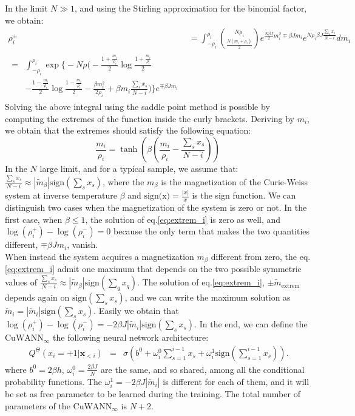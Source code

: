 \documentclass[aps,physrev,10pt,floatfix,longbibliography,nofootinbib,reprint]{revtex4-2}
\begin{document}
In the limit $N \gg 1$, and using the Stirling approximation for the binomial factor, we obtain:
 \begin{align}
 \rho_i^{\pm} & = 
  \int_{-\rho_i}^{\rho_i} \binom{N\rho_i}{\frac{N(m_i+\rho_i)}{2}} e^{\frac{N \beta J}{2}m_i^{2} \mp \beta J m_i } e^{N \rho_i \beta J \frac{\sum_s x_s}{N-i}} dm_i \\
\begin{split} 
  = & \int_{-\rho_i}^{\rho_i} \exp\bigg\{-N\rho\big( -\frac{1+\frac{m_i}{\rho_i}}{2} \log\frac{1+\frac{m_i}{\rho_i}}{2} \\
   & - \frac{1-\frac{m_i}{\rho_i}}{2} \log\frac{1-\frac{m_i}{\rho_i}}{2} 
      - \frac{\beta m_i^2}{2 \rho_i} + \beta m_i \frac{\sum_s x_s}{N-i}\big) \bigg\} e^{\mp \beta J m_i}
\end{split}
\end{align}
Solving the above integral using the saddle point method is possible by computing the extremes of the function inside the curly brackets. Deriving by $m_i$, we obtain that the extremes should satisfy the following equation:
\begin{equation}
\frac{m_i}{\rho_i} = \tanh \left( \beta(\frac{m_i}{\rho_i} - \frac{\sum_s x_s}{N-i}) \right)
\label{eq:extrem_i}
\end{equation}
In the $N$ large limit, and for a typical sample, we assume that: $\frac{\sum_s x_s}{N-i} \approx |\tilde{m}_{\beta}| \text{sign}(\sum_s x_s)$, where the $m_{\beta}$ is the magnetization of the Curie-Weiss system at inverse temperature $\beta$ and $\text{sign(x)} = \frac{|x|}{x}$ is the sign function.
We can distinguish two cases when the magnetization of the system is zero or not. 
In the first case, when $\beta\leq 1$, the solution of eq.\ref{eq:extrem_i} is zero as well, and $\log(\rho_i^{+}) - \log(\rho_i^{-})=0$ because the only term that makes the two quantities different, $\mp \beta J m_i$, vanish.\\ 
When instead the system acquires a magnetization $m_{\beta}$ different from zero, the eq.\ref{eq:extrem_i} admit one maximum that depends on the two possible symmetric values of $\frac{\sum_s x_s}{N-i}\approx |\tilde{m}_{\beta}| \text{sign}(\sum_q x_q)$. 
The solution of eq.\ref{eq:extrem_i}, $\pm \tilde{m}_{\text{extrem}}$ depends again on $\text{sign}(\sum_s x_s)$, and we can write the maximum solution as $\tilde{m}_{i}=|\tilde{m}_i| \text{sign}(\sum_s x_s)$. 
Easily we obtain that $\log(\rho_i^{+}) - \log(\rho_i^{-}) = -2\beta J|\tilde{m}_i| \text{sign}(\sum_s x_s)$. 
In the end, we can define the $\text{CuWANN}_{\infty}$ the following neural network architecture:
\begin{eqnarray}\
\label{eq:curie_weiss_cond2}
Q^{\Theta}\left(x_{i}=+1|\mathbf{x}_{<i}\right) & = & \sigma \left(b^0+\omega_{i}^0\sum_{s=1}^{i-1}x_{s} + \omega_i^1 \text{sign}(\sum_{s=1}^{i-1}x_{s})\right).
\end{eqnarray}
where $b^0=2\beta h$, $\omega^0_i = \frac{2\beta J}{N}$ are the same, and so shared, among all the conditional probability functions. The $\omega^1_i = -2\beta J |\tilde{m}_i|$ is different for each of them, and it will be set as free parameter to be learned during the training. The total number of parameters of the $\text{CuWANN}_{\infty}$ is $N+2$.
\end{document}
